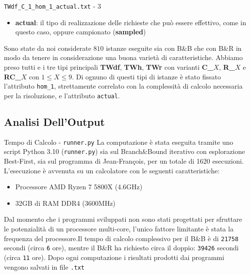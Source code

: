 \documentclass[10pt]{beamer}
\begin{document}
    \begin{frame}{\texttt{TWdf\_C\_1\_hom\_1\_actual.txt} - 3}
        \begin{itemize}
            \item \textbf{actual}: il tipo di realizzazione delle richieste che può essere effettivo, come in questo caso, oppure campionato (\textbf{sampled}) 
        \end{itemize}
        Sono state da noi considerate $810$ istanze eseguite sia con B\&B che con B\&R in modo da tenere in considerazione una buona varietà di caratteristiche. Abbiamo preso tutti e i tre tipi principali \textbf{TWdf}, \textbf{TWh}, \textbf{TWr} con varianti \textbf{C\_}$X$, \textbf{R\_}$X$ e \textbf{RC\_}$X$ con $1 \leq X \leq 9$. Di ognuno di questi tipi di istanze è stato fissato l'attributo \texttt{hom\_1}, strettamente correlato con la complessità di calcolo necessaria per la risoluzione, e l'attributo \texttt{actual}.
    \end{frame}

    \subsection{Analisi Dell'Output}
    \begin{frame}{Tempo di Calcolo - \texttt{runner.py}}
        La computazione è stata eseguita tramite uno script Python 3.10 (\texttt{runner.py}) sia sul Branch\&Bound iterativo con esplorazione Best-First, sia sul programma di Jean-François, per un totale di 1620 esecuzioni. L'esecuzione è avvenuta su un calcolatore con le seguenti caratteristiche:
        \begin{itemize}
            \item Processore AMD Ryzen 7 5800X (4.6GHz)
            \item 32GB di RAM DDR4 (3600MHz)
        \end{itemize}
        Dal momento che i programmi sviluppati non sono stati progettati per sfruttare le potenzialità di un processore multi-core, l'unico fattore limitante è stata la frequenza del processore.Il tempo di calcolo complessivo per il B\&B è di \texttt{21758} secondi (circa \texttt{6} ore), mentre il B\&R ha richiesto circa il doppio: \texttt{39426} secondi (circa \texttt{11} ore). Dopo ogni computazione i risultati prodotti dai programmi vengono salvati in file \texttt{.txt}
    \end{frame}
\end{document}
